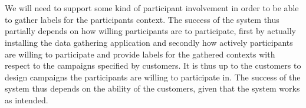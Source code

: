 \\\\
We will need to support some kind of participant involvement in order to be able to gather labels for the participants context. The success of the system thus partially depends on how willing participants are to participate, first by actually installing the data gathering application and secondly how actively participants are willing to participate and provide labels for the gathered contexts with respect to the campaigns specified by customers. It is thus up to the customers to design campaigns the participants are willing to participate in. The success of the system thus depends on the ability of the customers, given that the system works as intended.
